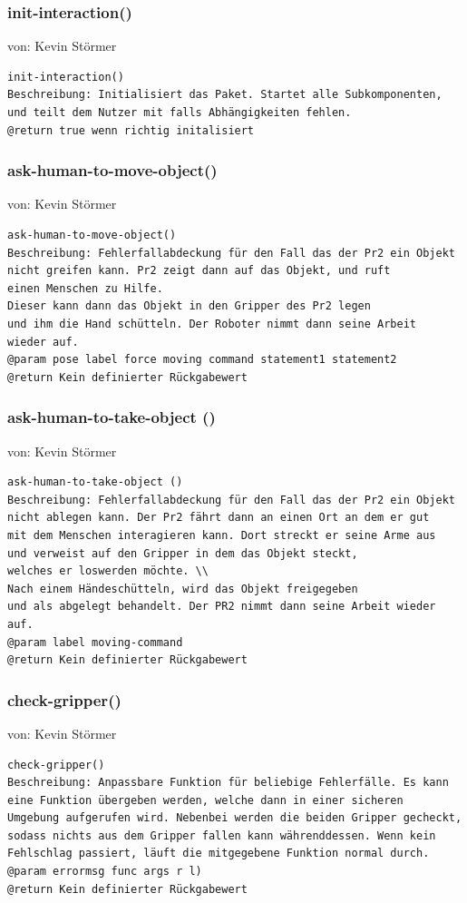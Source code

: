 \documentclass{suturo}
\makeatletter
\newcommand{\chapterauthor}[1]{%
  {\parindent0pt\vspace*{-27pt}%
  \linespread{0}\small\begin{flushright}von: #1\end{flushright}%
  \par\nobreak\vspace*{0pt}}
  \@afterheading%
}
\makeatother
\begin{document}
\subsubsection{init-interaction()}
\chapterauthor{Kevin Störmer}
\begin{verbatim}
init-interaction()
Beschreibung: Initialisiert das Paket. Startet alle Subkomponenten, 
und teilt dem Nutzer mit falls Abhängigkeiten fehlen.
@return true wenn richtig initalisiert
\end{verbatim}

\subsubsection{ask-human-to-move-object()}
\chapterauthor{Kevin Störmer}
\begin{verbatim}
ask-human-to-move-object()
Beschreibung: Fehlerfallabdeckung für den Fall das der Pr2 ein Objekt
nicht greifen kann. Pr2 zeigt dann auf das Objekt, und ruft 
einen Menschen zu Hilfe.
Dieser kann dann das Objekt in den Gripper des Pr2 legen 
und ihm die Hand schütteln. Der Roboter nimmt dann seine Arbeit 
wieder auf.
@param pose label force moving command statement1 statement2
@return Kein definierter Rückgabewert
\end{verbatim}

\subsubsection{ask-human-to-take-object ()}
\chapterauthor{Kevin Störmer}
\begin{verbatim}
ask-human-to-take-object ()
Beschreibung: Fehlerfallabdeckung für den Fall das der Pr2 ein Objekt 
nicht ablegen kann. Der Pr2 fährt dann an einen Ort an dem er gut 
mit dem Menschen interagieren kann. Dort streckt er seine Arme aus 
und verweist auf den Gripper in dem das Objekt steckt, 
welches er loswerden möchte. \\
Nach einem Händeschütteln, wird das Objekt freigegeben 
und als abgelegt behandelt. Der PR2 nimmt dann seine Arbeit wieder auf.
@param label moving-command
@return Kein definierter Rückgabewert
\end{verbatim}

\subsubsection{check-gripper()}
\chapterauthor{Kevin Störmer}
\begin{verbatim}
check-gripper()
Beschreibung: Anpassbare Funktion für beliebige Fehlerfälle. Es kann 
eine Funktion übergeben werden, welche dann in einer sicheren 
Umgebung aufgerufen wird. Nebenbei werden die beiden Gripper gecheckt, 
sodass nichts aus dem Gripper fallen kann währenddessen. Wenn kein 
Fehlschlag passiert, läuft die mitgegebene Funktion normal durch.
@param errormsg func args r l)
@return Kein definierter Rückgabewert
\end{verbatim}
\end{document}
